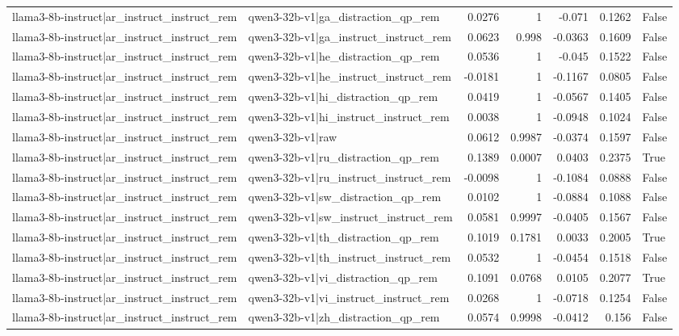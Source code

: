 \begin{table}
\begin{tabular}{l l r r r r l}
llama3-8b-instruct|ar_instruct_instruct_rem & qwen3-32b-v1|ga_distraction_qp_rem & 0.0276 & 1 & -0.071 & 0.1262 & False \\
llama3-8b-instruct|ar_instruct_instruct_rem & qwen3-32b-v1|ga_instruct_instruct_rem & 0.0623 & 0.998 & -0.0363 & 0.1609 & False \\
llama3-8b-instruct|ar_instruct_instruct_rem & qwen3-32b-v1|he_distraction_qp_rem & 0.0536 & 1 & -0.045 & 0.1522 & False \\
llama3-8b-instruct|ar_instruct_instruct_rem & qwen3-32b-v1|he_instruct_instruct_rem & -0.0181 & 1 & -0.1167 & 0.0805 & False \\
llama3-8b-instruct|ar_instruct_instruct_rem & qwen3-32b-v1|hi_distraction_qp_rem & 0.0419 & 1 & -0.0567 & 0.1405 & False \\
llama3-8b-instruct|ar_instruct_instruct_rem & qwen3-32b-v1|hi_instruct_instruct_rem & 0.0038 & 1 & -0.0948 & 0.1024 & False \\
llama3-8b-instruct|ar_instruct_instruct_rem & qwen3-32b-v1|raw & 0.0612 & 0.9987 & -0.0374 & 0.1597 & False \\
llama3-8b-instruct|ar_instruct_instruct_rem & qwen3-32b-v1|ru_distraction_qp_rem & 0.1389 & 0.0007 & 0.0403 & 0.2375 & True \\
llama3-8b-instruct|ar_instruct_instruct_rem & qwen3-32b-v1|ru_instruct_instruct_rem & -0.0098 & 1 & -0.1084 & 0.0888 & False \\
llama3-8b-instruct|ar_instruct_instruct_rem & qwen3-32b-v1|sw_distraction_qp_rem & 0.0102 & 1 & -0.0884 & 0.1088 & False \\
llama3-8b-instruct|ar_instruct_instruct_rem & qwen3-32b-v1|sw_instruct_instruct_rem & 0.0581 & 0.9997 & -0.0405 & 0.1567 & False \\
llama3-8b-instruct|ar_instruct_instruct_rem & qwen3-32b-v1|th_distraction_qp_rem & 0.1019 & 0.1781 & 0.0033 & 0.2005 & True \\
llama3-8b-instruct|ar_instruct_instruct_rem & qwen3-32b-v1|th_instruct_instruct_rem & 0.0532 & 1 & -0.0454 & 0.1518 & False \\
llama3-8b-instruct|ar_instruct_instruct_rem & qwen3-32b-v1|vi_distraction_qp_rem & 0.1091 & 0.0768 & 0.0105 & 0.2077 & True \\
llama3-8b-instruct|ar_instruct_instruct_rem & qwen3-32b-v1|vi_instruct_instruct_rem & 0.0268 & 1 & -0.0718 & 0.1254 & False \\
llama3-8b-instruct|ar_instruct_instruct_rem & qwen3-32b-v1|zh_distraction_qp_rem & 0.0574 & 0.9998 & -0.0412 & 0.156 & False \\

\end{tabular}
\end{table}
